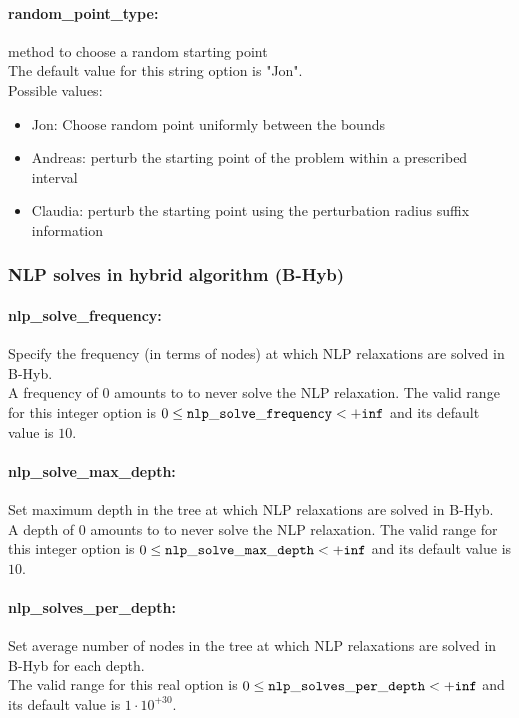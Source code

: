 \paragraph{random\_point\_type:}\label{sec:random_point_type} method to choose a random starting point $\;$ \\
The default value for this string option is "Jon".
\\ 
Possible values:
\begin{itemize}
   \item Jon: Choose random point uniformly between the bounds
   \item Andreas: perturb the starting point of the problem
within a prescribed interval
   \item Claudia: perturb the starting point using the
perturbation radius suffix information
\end{itemize}

\subsubsection{NLP solves in hybrid algorithm (B-Hyb)}
\label{sec:NLP_solves_in_hybrid_algorithm_(B-Hyb)}

\paragraph{nlp\_solve\_frequency:}\label{sec:nlp_solve_frequency} Specify the frequency (in terms of nodes) at which NLP relaxations are solved in B-Hyb. $\;$ \\
 A frequency of 0 amounts to to never solve the
NLP relaxation. The valid range for this integer option is
$0 \le {\tt nlp\_solve\_frequency } <  {\tt +inf}$
and its default value is $10$.


\paragraph{nlp\_solve\_max\_depth:}\label{sec:nlp_solve_max_depth} Set maximum depth in the tree at which NLP relaxations are solved in B-Hyb. $\;$ \\
 A depth of 0 amounts to to never solve the NLP
relaxation. The valid range for this integer option is
$0 \le {\tt nlp\_solve\_max\_depth } <  {\tt +inf}$
and its default value is $10$.


\paragraph{nlp\_solves\_per\_depth:}\label{sec:nlp_solves_per_depth} Set average number of nodes in the tree at which NLP relaxations are solved in B-Hyb for each depth. $\;$ \\
 The valid range for this real option is 
$0 \le {\tt nlp\_solves\_per\_depth } <  {\tt +inf}$
and its default value is $1 \cdot 10^{+30}$.


